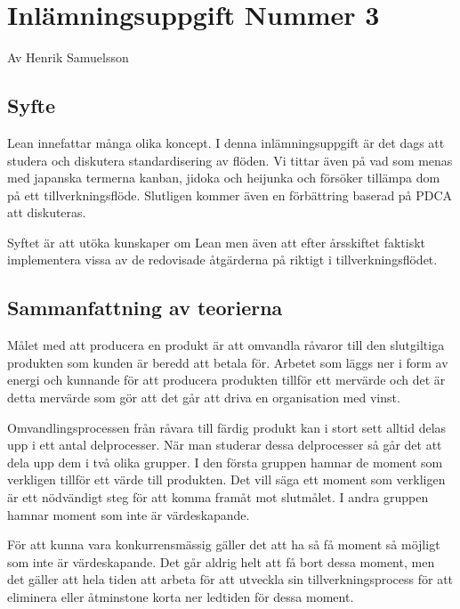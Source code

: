 \documentclass{article}
\begin{document}
\section*{Inlämningsuppgift Nummer 3}
Av Henrik Samuelsson
\subsection*{Syfte}
Lean innefattar många olika koncept. I denna inlämningsuppgift är det dags att studera och diskutera standardisering av flöden. Vi tittar även på vad som menas med japanska termerna kanban, jidoka och  heijunka och försöker tillämpa dom på ett tillverkningsflöde. Slutligen kommer även en förbättring baserad på PDCA att diskuteras.

Syftet är att utöka kunskaper om Lean men även att efter årsskiftet faktiskt implementera  vissa av de redovisade åtgärderna på riktigt i tillverkningsflödet.

\subsection*{Sammanfattning av teorierna}
Målet med att producera en produkt är att omvandla råvaror till den slutgiltiga produkten som kunden är beredd att betala för. Arbetet som läggs ner i form av energi och kunnande för att producera produkten tillför ett mervärde och det är detta mervärde som gör att det går att driva en organisation med vinst.

Omvandlingsprocessen från råvara till färdig produkt kan i stort sett alltid delas upp i ett antal delprocesser. När man studerar dessa delprocesser så går det att dela upp dem i två olika grupper. I den första gruppen hamnar de moment som verkligen tillför ett värde till produkten. Det vill säga ett moment som verkligen är ett nödvändigt steg för att komma framåt mot slutmålet. I andra gruppen hamnar moment som inte är värdeskapande.

För att kunna vara konkurrensmässig gäller det att ha så få moment så möjligt som inte är värdeskapande. Det går aldrig helt att få bort dessa moment, men det gäller att hela tiden att arbeta för att utveckla sin tillverkningsprocess för att eliminera eller åtminstone korta ner ledtiden för dessa moment. 
\end{document}
